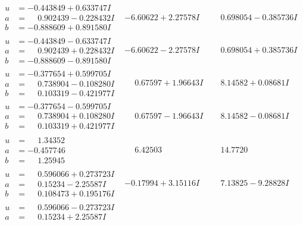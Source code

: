 \documentclass[1p]{elsarticle_modified}
\theoremstyle{definition}
\begin{document}
$$\begin{array}{c|c|c}
\begin{aligned}
u &= -0.443849 + 0.633747 I \\
a &= \phantom{-}0.902439 - 0.228432 I \\
b &= -0.888609 + 0.891580 I\end{aligned}
 & -6.60622 + 2.27578 I & \phantom{-}0.698054 - 0.385736 I \\ \hline\begin{aligned}
u &= -0.443849 - 0.633747 I \\
a &= \phantom{-}0.902439 + 0.228432 I \\
b &= -0.888609 - 0.891580 I\end{aligned}
 & -6.60622 - 2.27578 I & \phantom{-}0.698054 + 0.385736 I \\ \hline\begin{aligned}
u &= -0.377654 + 0.599705 I \\
a &= \phantom{-}0.738904 - 0.108280 I \\
b &= \phantom{-}0.103319 - 0.421977 I\end{aligned}
 & \phantom{-}0.67597 + 1.96643 I & \phantom{-}8.14582 + 0.08681 I \\ \hline\begin{aligned}
u &= -0.377654 - 0.599705 I \\
a &= \phantom{-}0.738904 + 0.108280 I \\
b &= \phantom{-}0.103319 + 0.421977 I\end{aligned}
 & \phantom{-}0.67597 - 1.96643 I & \phantom{-}8.14582 - 0.08681 I \\ \hline\begin{aligned}
u &= \phantom{-}1.34352\phantom{ +0.000000I} \\
a &= -0.457746\phantom{ +0.000000I} \\
b &= \phantom{-}1.25945\phantom{ +0.000000I}\end{aligned}
 & \phantom{-}6.42503\phantom{ +0.000000I} & \phantom{-}14.7720\phantom{ +0.000000I} \\ \hline\begin{aligned}
u &= \phantom{-}0.596066 + 0.273723 I \\
a &= \phantom{-}0.15234 - 2.25587 I \\
b &= \phantom{-}0.108473 + 0.195176 I\end{aligned}
 & -0.17994 + 3.15116 I & \phantom{-}7.13825 - 9.28828 I \\ \hline\begin{aligned}
u &= \phantom{-}0.596066 - 0.273723 I \\
a &= \phantom{-}0.15234 + 2.25587 I \\

\end{aligned}
\end{array}$$
\end{document}
